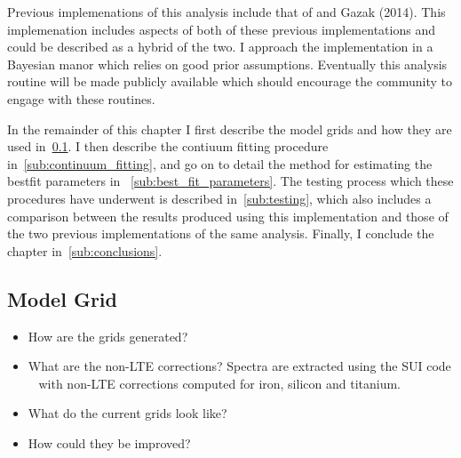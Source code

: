 \documentclass[12pt]{article}
\begin{document}
Previous implemenations of this analysis include that of
\cite{2010MNRAS.407.1203D} and Gazak (2014).
This implemenation includes aspects of both of these previous implementations and could be described as a hybrid of the two.
I approach the implementation in a Bayesian manor which relies on good prior assumptions.
Eventually this analysis routine will be made publicly available which should encourage the community to engage with these routines.

In the remainder of this chapter I first describe the model grids and how they are used in~\ref{sub:model_grid}.
I then describe the contiuum fitting procedure in~\ref{sub:continuum_fitting},
and go on to detail the method for estimating the bestfit parameters in
~\ref{sub:best_fit_parameters}.
The testing process which these procedures have underwent is described in~\ref{sub:testing}, which also includes a comparison between the results produced using this implementation and those of the two previous implementations of the same analysis.
Finally, I conclude the chapter in~\ref{sub:conclusions}.


\subsection{Model Grid} %


\label{sub:model_grid}
\begin{itemize}
    \item How are the grids generated?
    \item What are the non-LTE corrections?
Spectra are extracted using the SUI code
~\cite{2012ApJ...751..156B,2013ApJ...764..115B,2014arXiv1412.6527B}
with non-LTE corrections computed for iron, silicon and titanium.
    \item What do the current grids look like?
    \item How could they be improved?
\end{itemize}
\end{document}
